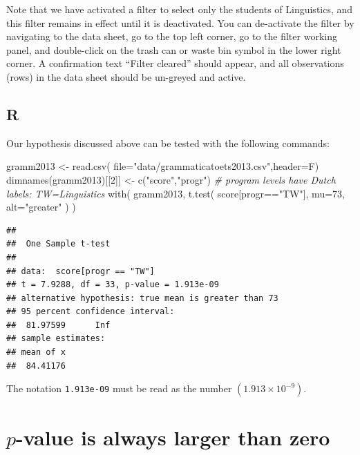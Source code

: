 \documentclass[
]{book}
\newenvironment{Shaded}{\begin{snugshade}}{\end{snugshade}}
\newcommand{\AttributeTok}[1]{\textcolor[rgb]{0.77,0.63,0.00}{#1}}
\newcommand{\CommentTok}[1]{\textcolor[rgb]{0.56,0.35,0.01}{\textit{#1}}}
\newcommand{\DecValTok}[1]{\textcolor[rgb]{0.00,0.00,0.81}{#1}}
\newcommand{\FunctionTok}[1]{\textcolor[rgb]{0.00,0.00,0.00}{#1}}
\newcommand{\NormalTok}[1]{#1}
\newcommand{\OtherTok}[1]{\textcolor[rgb]{0.56,0.35,0.01}{#1}}
\newcommand{\SpecialCharTok}[1]{\textcolor[rgb]{0.00,0.00,0.00}{#1}}
\newcommand{\StringTok}[1]{\textcolor[rgb]{0.31,0.60,0.02}{#1}}
\begin{document}
Note that we have activated a filter to select only the students of Linguistics, and this filter remains in effect until it is deactivated. You can de-activate the filter by navigating to the data sheet, go to the top left corner, go to the filter working panel, and double-click on the trash can or waste bin symbol in the lower right corner. A confirmation text ``Filter cleared'' should appear, and all observations (rows) in the data sheet should be un-greyed and active.

\hypertarget{r-12}{%
\subsection{R}\label{r-12}}

Our hypothesis discussed above can be tested with the following commands:

\begin{Shaded}
\begin{Highlighting}[]
\NormalTok{gramm2013 }\OtherTok{\textless{}{-}} \FunctionTok{read.csv}\NormalTok{( }\AttributeTok{file=}\StringTok{"data/grammaticatoets2013.csv"}\NormalTok{,}\AttributeTok{header=}\NormalTok{F)}
\FunctionTok{dimnames}\NormalTok{(gramm2013)[[}\DecValTok{2}\NormalTok{]] }\OtherTok{\textless{}{-}} \FunctionTok{c}\NormalTok{(}\StringTok{"score"}\NormalTok{,}\StringTok{"progr"}\NormalTok{)}
\CommentTok{\# program levels have Dutch labels: TW=Linguistics}
\FunctionTok{with}\NormalTok{( gramm2013,}
      \FunctionTok{t.test}\NormalTok{( score[progr}\SpecialCharTok{==}\StringTok{"TW"}\NormalTok{], }\AttributeTok{mu=}\DecValTok{73}\NormalTok{, }\AttributeTok{alt=}\StringTok{"greater"}\NormalTok{ ) )}
\end{Highlighting}
\end{Shaded}

\begin{verbatim}
## 
##  One Sample t-test
## 
## data:  score[progr == "TW"]
## t = 7.9288, df = 33, p-value = 1.913e-09
## alternative hypothesis: true mean is greater than 73
## 95 percent confidence interval:
##  81.97599      Inf
## sample estimates:
## mean of x 
##  84.41176
\end{verbatim}

The notation \texttt{1.913e-09} must be read as the number
\((1.913 \times 10^{-9})\).

\hypertarget{sec:plargerthannull}{%
\section{\texorpdfstring{\(p\)-value is always larger than zero}{p-value is always larger than zero}}\label{sec:plargerthannull}}
\end{document}
